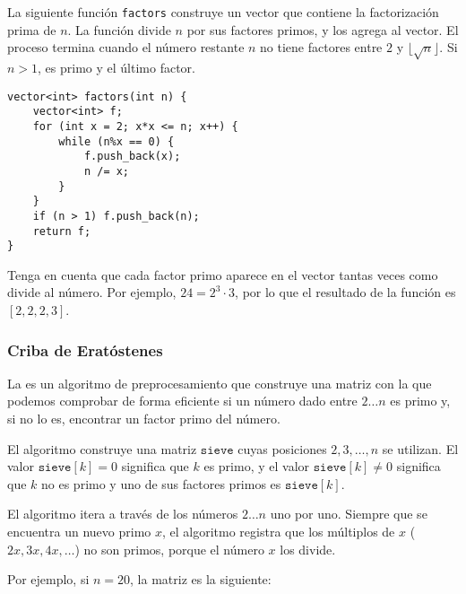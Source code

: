 \noindent
La siguiente función \texttt{factors}
construye un vector que contiene la factorización prima
de $n$.
La función divide $n$ por sus factores primos,
y los agrega al vector.
El proceso termina cuando el número restante $n$
no tiene factores entre $2$ y $\lfloor \sqrt n \rfloor$.
Si $n>1$, es primo y el último factor.

\begin{lstlisting}
vector<int> factors(int n) {
    vector<int> f;
    for (int x = 2; x*x <= n; x++) {
        while (n%x == 0) {
            f.push_back(x);
            n /= x;
        }
    }
    if (n > 1) f.push_back(n);
    return f;
}
\end{lstlisting}

Tenga en cuenta que cada factor primo aparece en el vector
tantas veces como divide al número.
Por ejemplo, $24=2^3 \cdot 3$,
por lo que el resultado de la función es $[2,2,2,3]$.

\subsubsection{Criba de Eratóstenes}


La 
es un algoritmo de preprocesamiento
que construye una matriz con la que podemos
comprobar de forma eficiente si un número dado entre $2 \ldots n$
es primo y, si no lo es, encontrar un factor primo del número.

El algoritmo construye una matriz $\texttt{sieve}$
cuyas posiciones $2,3,\ldots,n$ se utilizan.
El valor $\texttt{sieve}[k]=0$ significa
que $k$ es primo,
y el valor $\texttt{sieve}[k] \neq 0$
significa que $k$ no es primo y uno
de sus factores primos es $\texttt{sieve}[k]$.

El algoritmo itera a través de los números
$2 \ldots n$ uno por uno.
Siempre que se encuentra un nuevo primo $x$,
el algoritmo registra que los múltiplos
de $x$ ($2x,3x,4x,\ldots$) no son primos,
porque el número $x$ los divide.

Por ejemplo, si $n=20$, la matriz es la siguiente:

